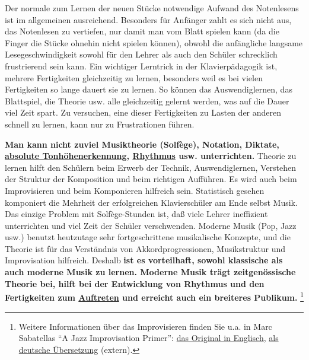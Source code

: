 Der normale zum Lernen der neuen Stücke notwendige Aufwand des Notenlesens ist im allgemeinen ausreichend.
Besonders für Anfänger zahlt es sich nicht aus, das Notenlesen zu vertiefen, nur damit man vom Blatt spielen kann (da die Finger die Stücke ohnehin nicht spielen können), obwohl die anfängliche langsame Lesegeschwindigkeit sowohl für den Lehrer als auch den Schüler schrecklich frustrierend sein kann.
Ein wichtiger Lerntrick in der Klavierpädagogik ist, mehrere Fertigkeiten gleichzeitig zu lernen, besonders weil es bei vielen Fertigkeiten so lange dauert sie zu lernen.
So können das Auswendiglernen, das Blattspiel, die Theorie usw. alle gleichzeitig gelernt werden, was auf die Dauer viel Zeit spart.
Zu versuchen, eine dieser Fertigkeiten zu Lasten der anderen schnell zu lernen, kann nur zu Frustrationen führen.

\textbf{Man kann nicht zuviel Musiktheorie (Solfège), Notation, Diktate, \hyperlink{c1iii12}{absolute Tonhöhenerkennung}, \hyperlink{c1iii1b}{Rhythmus} usw. unterrichten.}
Theorie zu lernen hilft den Schülern beim Erwerb der Technik, Auswendiglernen, Verstehen der Struktur der Komposition und beim richtigen Aufführen.
Es wird auch beim Improvisieren und beim Komponieren hilfreich sein.
Statistisch gesehen komponiert die Mehrheit der erfolgreichen Klavierschüler am Ende selbst Musik.
Das einzige Problem mit Solfège-Stunden ist, daß viele Lehrer ineffizient unterrichten und viel Zeit der Schüler verschwenden.
Moderne Musik (Pop, Jazz usw.) benutzt heutzutage sehr fortgeschrittene musikalische Konzepte, und die Theorie ist für das Verständnis von Akkordprogressionen, Musikstruktur und Improvisation hilfreich.
Deshalb \textbf{ist es vorteilhaft, sowohl klassische als auch moderne Musik zu lernen.
Moderne Musik trägt zeitgenössische Theorie bei, hilft bei der Entwicklung von Rhythmus und den Fertigkeiten zum \hyperlink{c1iii14}{Auftreten} und erreicht auch ein breiteres Publikum.}
\hypertarget{c040119}{}
\footnote{Weitere Informationen über das Improvisieren finden Sie u.a. in Marc Sabatellas \enquote{A Jazz Improvisation Primer}: \hyperref[http://www.outsideshore.com/primer/primer/index.html]{das Original in Englisch}, \hyperref[http://msjipde.uteedgar-lins.de/index.html]{als deutsche Übersetzung} (extern).}

